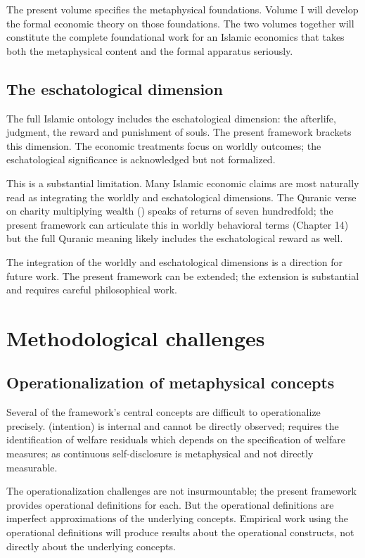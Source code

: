 The present volume specifies the metaphysical foundations. Volume
I will develop the formal economic theory on those foundations.
The two volumes together will constitute the complete
foundational work for an Islamic economics that takes both the
metaphysical content and the formal apparatus seriously.

\subsection{The eschatological dimension}

The full Islamic ontology includes the eschatological dimension:
the afterlife, judgment, the reward and punishment of souls. The
present framework brackets this dimension. The economic
treatments focus on worldly outcomes; the eschatological
significance is acknowledged but not formalized.

This is a substantial limitation. Many Islamic economic claims
are most naturally read as integrating the worldly and
eschatological dimensions. The Quranic verse on charity
multiplying wealth () speaks of returns of seven
hundredfold; the present framework can articulate this in
worldly behavioral terms (Chapter 14) but the full Quranic
meaning likely includes the eschatological reward as well.

The integration of the worldly and eschatological dimensions is a
direction for future work. The present framework can be extended;
the extension is substantial and requires careful philosophical
work.

\section{Methodological challenges}
\label{sec:open-methodological}

\subsection{Operationalization of metaphysical concepts}

Several of the framework's central concepts are difficult to
operationalize precisely.  (intention) is internal
and cannot be directly observed;  requires the
identification of welfare residuals which depends on the
specification of welfare measures;  as continuous
self-disclosure is metaphysical and not directly measurable.

The operationalization challenges are not insurmountable; the
present framework provides operational definitions for each. But
the operational definitions are imperfect approximations of the
underlying concepts. Empirical work using the operational
definitions will produce results about the operational
constructs, not directly about the underlying concepts.

